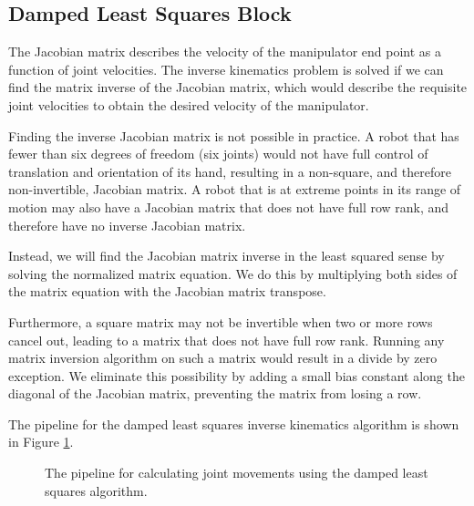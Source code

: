\subsection{Damped Least Squares Block}

The Jacobian matrix describes the velocity of the manipulator end point as a function of joint velocities. The inverse kinematics problem is solved if we can find the matrix inverse of the Jacobian matrix, which would describe the requisite joint velocities to obtain the desired velocity of the manipulator.

Finding the inverse Jacobian matrix is not possible in practice. A robot that has fewer than six degrees of freedom (six joints) would not have full control of translation and orientation of its hand, resulting in a non-square, and therefore non-invertible, Jacobian matrix. A robot that is at extreme points in its range of motion may also have a Jacobian matrix that does not have full row rank, and therefore have no inverse Jacobian matrix.

Instead, we will find the Jacobian matrix inverse in the least squared sense by solving the normalized matrix equation. We do this by multiplying both sides of the matrix equation with the Jacobian matrix transpose.

Furthermore, a square matrix may not be invertible when two or more rows cancel out, leading to a matrix that does not have full row rank. Running any matrix inversion algorithm on such a matrix would result in a divide by zero exception. We eliminate this possibility by adding a small bias constant along the diagonal of the Jacobian matrix, preventing the matrix from losing a row.

The pipeline for the damped least squares inverse kinematics algorithm is shown in Figure \ref{fig:damped_least_squares}.

\begin{figure}[ht]
\center
{}
\caption{The pipeline for calculating joint movements using the damped least squares algorithm.}
\label{fig:damped_least_squares}
\end{figure}